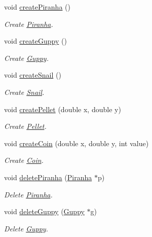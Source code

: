 \begin{DoxyCompactItemize}
void \mbox{\hyperlink{class_aquarium_a416b16bc7c252260b9cbe053a6e5a76c}{create\+Piranha}} ()
\begin{DoxyCompactList}\small\item\em Create \mbox{\hyperlink{class_piranha}{Piranha}}. \end{DoxyCompactList}\item 
void \mbox{\hyperlink{class_aquarium_a44ab0beff51d6607e0f590270d9066b5}{create\+Guppy}} ()
\begin{DoxyCompactList}\small\item\em Create \mbox{\hyperlink{class_guppy}{Guppy}}. \end{DoxyCompactList}\item 
void \mbox{\hyperlink{class_aquarium_ae631c3fd8587b1889ffea4e0ade6359e}{create\+Snail}} ()
\begin{DoxyCompactList}\small\item\em Create \mbox{\hyperlink{class_snail}{Snail}}. \end{DoxyCompactList}\item 
void \mbox{\hyperlink{class_aquarium_a049ffa77e7bbb68ac031a098c4e635e7}{create\+Pellet}} (double x, double y)
\begin{DoxyCompactList}\small\item\em Create \mbox{\hyperlink{class_pellet}{Pellet}}. \end{DoxyCompactList}\item 
void \mbox{\hyperlink{class_aquarium_aec1e8fb9d89399012733c747ec9e80ff}{create\+Coin}} (double x, double y, int value)
\begin{DoxyCompactList}\small\item\em Create \mbox{\hyperlink{class_coin}{Coin}}. \end{DoxyCompactList}\item 
void \mbox{\hyperlink{class_aquarium_a86cec76f7e0cbbdff79d5cef1e6e7f84}{delete\+Piranha}} (\mbox{\hyperlink{class_piranha}{Piranha}} $\ast$p)
\begin{DoxyCompactList}\small\item\em Delete \mbox{\hyperlink{class_piranha}{Piranha}}. \end{DoxyCompactList}\item 
void \mbox{\hyperlink{class_aquarium_ae2372aef40d9474573833262b6062eb2}{delete\+Guppy}} (\mbox{\hyperlink{class_guppy}{Guppy}} $\ast$g)
\begin{DoxyCompactList}\small\item\em Delete \mbox{\hyperlink{class_guppy}{Guppy}}. \end{DoxyCompactList}\item 

\end{DoxyCompactItemize}
